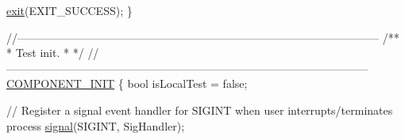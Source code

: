 \begin{DoxyCodeInclude}
{{{{{{{{{{{{    \hyperlink{app_stop_client_8c_a310220604a584e112ba8f7aa3dfe23f1}{exit}(EXIT\_SUCCESS);
\}

\textcolor{comment}{//--------------------------------------------------------------------------------------------------}\textcolor{comment}{}
\textcolor{comment}{/**}
\textcolor{comment}{ * Test init.}
\textcolor{comment}{ *}
\textcolor{comment}{ */}
\textcolor{comment}{//--------------------------------------------------------------------------------------------------}
\hyperlink{le__event_loop_8h_abdb9187a56836a93d19cc793cbd4b7ec}{COMPONENT\_INIT}
\{
    \textcolor{keywordtype}{bool} isLocalTest = \textcolor{keyword}{false};

    \textcolor{comment}{// Register a signal event handler for SIGINT when user interrupts/terminates process}
    \hyperlink{wifi_ap_test_8c_a8db34e235c60f54c3df89f2b6b8ca3ed}{signal}(SIGINT, SigHandler);

}}}}}}}}}}}}
\end{DoxyCodeInclude}
